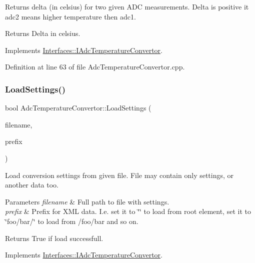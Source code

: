 Returns delta (in celsius) for two given A\+DC measurements. Delta is positive it adc2 means higher temperature then adc1. 

\begin{DoxyReturn}{Returns}
Delta in celsius. 
\end{DoxyReturn}


Implements \hyperlink{class_interfaces_1_1_i_adc_temperature_convertor_a70d62425963cadadd88db1d7028bf722}{Interfaces\+::\+I\+Adc\+Temperature\+Convertor}.



Definition at line 63 of file Adc\+Temperature\+Convertor.\+cpp.

\mbox{\label{class_adc_temperature_convertor_ac45f10e678aa2f9e25c5351dfd283de0}} 
\subsubsection{\texorpdfstring{Load\+Settings()}{LoadSettings()}}
{\footnotesize\ttfamily bool Adc\+Temperature\+Convertor\+::\+Load\+Settings (\begin{DoxyParamCaption}\item[{Q\+String}]{filename,  }\item[{Q\+String}]{prefix }\end{DoxyParamCaption})\hspace{0.3cm}{\ttfamily [virtual]}}



Load conversion settings from given file. File may contain only settings, or another data too. 


\begin{DoxyParams}{Parameters}
{\em filename} & Full path to file with settings. \\
\hline
{\em prefix} & Prefix for X\+ML data. I.\+e. set it to \char`\"{}\char`\"{} to load from root element, set it to \char`\"{}foo/bar/\char`\"{} to load from /foo/bar and so on. \\
\hline
\end{DoxyParams}
\begin{DoxyReturn}{Returns}
True if load successfull. 
\end{DoxyReturn}


Implements \hyperlink{class_interfaces_1_1_i_adc_temperature_convertor_a3b1d84ea243b62a36238f16433668a23}{Interfaces\+::\+I\+Adc\+Temperature\+Convertor}.



